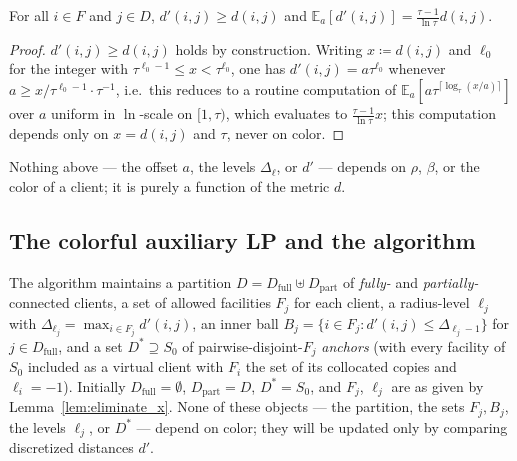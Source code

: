\documentclass[a4paper,11pt]{article}
\begin{document}
\begin{lemma}
\label{lem:random_dist}
For all $i \in F$ and $j \in D$, $d'(i, j) \ge d(i, j)$ and
$\mathbb{E}_a[d'(i, j)] = \frac{\tau - 1}{\ln \tau} d(i, j)$.
\end{lemma}

\begin{proof}
$d'(i,j)\ge d(i,j)$ holds by construction. Writing $x\coloneqq d(i,j)$
and $\ell_0$ for the integer with $\tau^{\ell_0-1}\le x<\tau^{\ell_0}$,
one has $d'(i,j)=a\tau^{\ell_0}$ whenever $a\ge x/\tau^{\ell_0-1}\cdot
\tau^{-1}$, i.e.\ this reduces to a routine computation of $\mathbb
E_a[a\tau^{\lceil \log_\tau(x/a)\rceil}]$ over $a$ uniform in $\ln$-scale
on $[1,\tau)$, which evaluates to $\frac{\tau-1}{\ln\tau}x$; this
computation depends only on $x=d(i,j)$ and $\tau$, never on color.
\end{proof}

Nothing above — the offset $a$, the levels $\Delta_\ell$, or $d'$ —
depends on $\rho$, $\beta$, or the color of a client; it is purely a
function of the metric $d$.

\subsection{The colorful auxiliary LP and the algorithm}
\label{sec:iter-lp}

The algorithm maintains a partition $D=D_\text{full}\uplus D_\text{part}$
of \emph{fully-} and \emph{partially-}connected clients, a set of
allowed facilities $F_j$ for each client, a radius-level $\ell_j$ with
$\Delta_{\ell_j} = \max_{i\in F_j} d'(i,j)$, an inner ball
$B_j=\{i\in F_j : d'(i,j)\le\Delta_{\ell_j-1}\}$ for $j\in D_\text{full}$,
and a set $D^*\supseteq S_0$ of pairwise-disjoint-$F_j$ \emph{anchors}
(with every facility of $S_0$ included as a virtual client with $F_i$ the
set of its collocated copies and $\ell_i=-1$). Initially $D_\text{full}=
\emptyset$, $D_\text{part}=D$, $D^*=S_0$, and $F_j$, $\ell_j$ are as
given by Lemma~\ref{lem:eliminate_x}. None of these objects — the
partition, the sets $F_j,B_j$, the levels $\ell_j$, or $D^*$ — depend on
color; they will be updated only by comparing discretized distances
$d'$.
\end{document}
